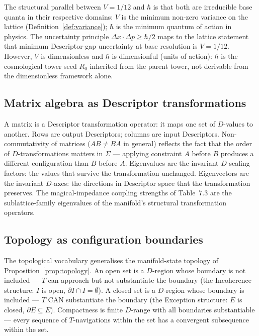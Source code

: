 \documentclass[11pt,a4paper]{article}
\theoremstyle{definition}
\theoremstyle{remark}
\begin{document}
The structural parallel between $V = 1/12$ and $\hbar$ is that both are irreducible base quanta in their respective domains: $V$ is the minimum non-zero variance on the lattice (Definition~\ref{def:variance}); $\hbar$ is the minimum quantum of action in physics. The uncertainty principle $\Delta x \cdot \Delta p \ge \hbar/2$ maps to the lattice statement that minimum Descriptor-gap uncertainty at base resolution is $V = 1/12$. However, $V$ is dimensionless and $\hbar$ is dimensionful (units of action): $\hbar$ is the cosmological tower seed $R_{0}$ inherited from the parent tower, not derivable from the dimensionless framework alone.

\subsection{Matrix algebra as Descriptor transformations}\label{subsec:matrices-D}

A matrix is a Descriptor transformation operator: it maps one set of $D$-values to another. Rows are output Descriptors; columns are input Descriptors. Non-commutativity of matrices ($AB \neq BA$ in general) reflects the fact that the order of $D$-transformations matters in $\Sigma$ --- applying constraint $A$ before $B$ produces a different configuration than $B$ before $A$. Eigenvalues are the invariant $D$-scaling factors: the values that survive the transformation unchanged. Eigenvectors are the invariant $D$-axes: the directions in Descriptor space that the transformation preserves. The magical-impedance coupling strengths of Table~7.3 are the sublattice-family eigenvalues of the manifold's structural transformation operators.

\subsection{Topology as configuration boundaries}\label{subsec:topology-config}

The topological vocabulary generalises the manifold-state topology of Proposition~\ref{prop:topology}. An open set is a $D$-region whose boundary is not included --- $T$ can approach but not substantiate the boundary (the Incoherence structure: $I$ is open, $\partial I \cap I = \emptyset$). A closed set is a $D$-region whose boundary is included --- $T$ CAN substantiate the boundary (the Exception structure: $E$ is closed, $\partial E \subseteq E$). Compactness is finite $D$-range with all boundaries substantiable --- every sequence of $T$-navigations within the set has a convergent subsequence within the set.
\end{document}
